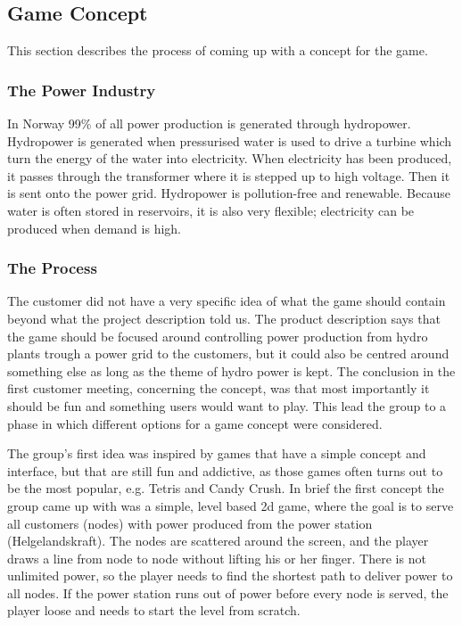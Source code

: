 \subsection{Game Concept}

This section describes the process of coming up with a concept for the game.

\subsubsection{The Power Industry}

In Norway 99\% of all power production is generated through hydropower. Hydropower is generated when pressurised water is used to drive a turbine which turn the energy of the water into electricity. When electricity has been produced, it passes through the transformer where it is stepped up to high voltage. Then it is sent onto the power grid. Hydropower is pollution-free and renewable. Because water is often stored in reservoirs, it is also very flexible; electricity can be produced when demand is high.

\subsubsection{The Process}

The customer did not have a very specific idea of what the game should contain
beyond what the project description told us. The product description says
that the game should be focused around controlling power production from
hydro plants trough a power grid to the customers, but it could also be
centred around something else as long as the theme of hydro power is kept. The
conclusion in the first customer meeting, concerning the concept, was that
most importantly it should be fun and something users would want to play. This
lead the group to a phase in which different options for a game concept were
considered.

The group's first idea was inspired by games that have a simple concept and
interface, but that are still fun and addictive, as those games often turns out
to be the most popular, e.g. Tetris and Candy Crush. In brief the first concept
the group came up with was a simple, level based 2d game, where the goal is
to serve all customers (nodes) with power produced from the power station
(Helgelandskraft). The nodes are scattered around the screen, and the player
draws a line from node to node without lifting his or her finger. There is
not unlimited power, so the player needs to find the shortest path to deliver
power to all nodes. If the power station runs out of power before every node is
served, the player loose and needs to start the level from scratch.

